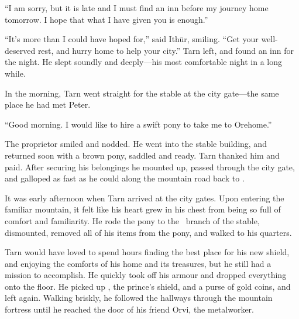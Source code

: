 ``I am sorry, but it is late and I must find an inn before my journey home tomorrow.  I hope that what I have given you is enough.''

``It's more than I could have hoped for,'' said Ith\=ur, smiling.  ``Get your well-deserved rest, and hurry home to help your city.''  Tarn left, and found an inn for the night.  He slept soundly and deeply---his most comfortable night in a long while.

In the morning, Tarn went straight for the stable at the city gate---the same place he had met Peter.

``Good morning.  I would like to hire a swift pony to take me to Orehome.''

The proprietor smiled and nodded.  He went into the stable building, and returned soon with a brown pony, saddled and ready.  Tarn thanked him and paid.  After securing his belongings he mounted up, passed through the city gate, and galloped as fast as he could along the mountain road back to \korbarthrond.

It was early afternoon when Tarn arrived at the city gates.  Upon entering the familiar mountain, it felt like his heart grew in his chest from being so full of comfort and familiarity.  He rode the pony to the \korbarthrond\ branch of the stable, dismounted, removed all of his items from the pony, and walked to his quarters.

Tarn would have loved to spend hours finding the best place for his new shield, and enjoying the comforts of his home and its treasures, but he still had a mission to accomplish.  He quickly took off his armour and dropped everything onto the floor. He picked up \kildir, the prince's shield, and a purse of gold coins, and left again.  Walking briskly, he followed the hallways through the mountain fortress until he reached the door of his friend Orvi, the metalworker.